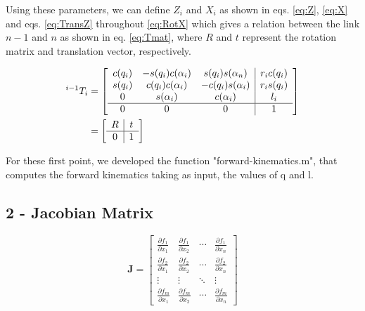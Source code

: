 Using these parameters, we can define $Z_i$ and $X_i$ as shown in eqs. \eqref{eq:Z}, \eqref{eq:X} and eqs. \eqref{eq:TransZ} throughout \eqref{eq:RotX} which gives a relation between the link $n-1$ and $n$ as shown in eq. \eqref{eq:Tmat}, where $R$ and $t$ represent the rotation matrix and translation vector, respectively.

\begin{equation}
    \begin{split}
        {}^{i-1}T_{i} & =
        \left[\begin{array}{c c c|c} 
	        c(q_i) & -s(q_i)c(\alpha_i) & s(q_i)s(\alpha_n) & r_i c(q_i) \\
            s(q_i) & c(q_i)c(\alpha_i) & -c(q_i)s(\alpha_i) & r_i s(q_i) \\
            0 & s(\alpha_i) & c(\alpha_i) & l_i \\ \hline 
            0 & 0 & 0 & 1
        \end{array}\right] \\
        & = 
        \left[\begin{array}{c|c} 
	        R & t \\ \hline 
            0 & 1
        \end{array}\right]
    \end{split}
    \label{eq:Tmat}
\end{equation}

For these first point, we developed the function "forward-kinematics.m", that computes the forward kinematics taking as input, the values of q and l.


\subsection{2 - Jacobian Matrix}

\begin{equation}
\mathbf{J} = \begin{bmatrix}
    \frac{\partial f_1}{\partial x_1} & \frac{\partial f_1}{\partial x_2} & \cdots & \frac{\partial f_1}{\partial x_n} \\
    \frac{\partial f_2}{\partial x_1} & \frac{\partial f_2}{\partial x_2} & \cdots & \frac{\partial f_2}{\partial x_n} \\
    \vdots & \vdots & \ddots & \vdots \\
    \frac{\partial f_m}{\partial x_1} & \frac{\partial f_m}{\partial x_2} & \cdots & \frac{\partial f_m}{\partial x_n}
\end{bmatrix}
\end{equation}

